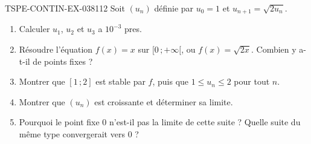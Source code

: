 \begin{exercice}{TSPE-CONTIN-EX-038}{1}{12}
Soit $(u_n)$ définie par $u_0 = 1$ et $u_{n+1} = \sqrt{2u_n}$.
\begin{enumerate}
  \item Calculer $u_1$, $u_2$ et $u_3$ a $10^{-3}$ pres.
  \item Résoudre l'équation $f(x) = x$ sur $[0\,;+\infty[$, ou $f(x) = \sqrt{2x}$. Combien y a-t-il de points fixes ?
  \item Montrer que $[1\,;2]$ est stable par $f$, puis que $1 \leq u_n \leq 2$ pour tout $n$.
  \item Montrer que $(u_n)$ est croissante et déterminer sa limite.
  \item Pourquoi le point fixe $0$ n'est-il pas la limite de cette suite ? Quelle suite du même type convergerait vers $0$ ?
\end{enumerate}
\end{exercice}
